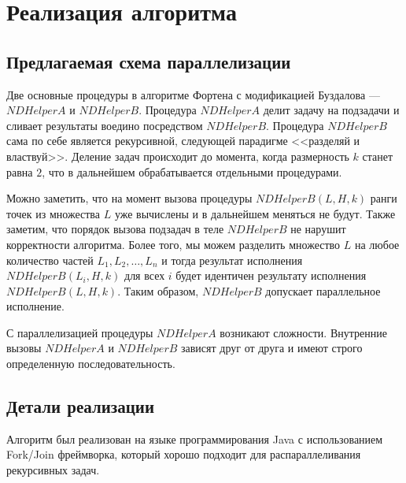 \chapter{Реализация алгоритма}
\section{Предлагаемая схема параллелизации}
Две основные процедуры в алгоритме Фортена с модификацией Буздалова --- $NDHelperA$ и $NDHelperB$. Процедура $NDHelperA$ делит задачу на подзадачи и сливает результаты воедино посредством $NDHelperB$. Процедура $NDHelperB$ сама по себе является рекурсивной, следующей парадигме <<разделяй и властвуй>>. Деление задач происходит до момента, когда размерность $k$ станет равна $2$, что в дальнейшем обрабатывается отдельными процедурами.

Можно заметить, что на момент вызова процедуры $NDHelperB(L, H, k)$ ранги точек из множества $L$ уже вычислены и в дальнейшем меняться не будут. Также заметим, что порядок вызова подзадач в теле $NDHelperB$ не нарушит корректности алгоритма. Более того, мы можем разделить множество $L$ на любое количество частей ${L_1, L_2,\ldots, L_n}$ и тогда результат исполнения $NDHelperB(L_i, H, k)$ для всех $i$ будет идентичен результату исполнения $NDHelperB(L, H, k)$. Таким образом, $NDHelperB$ допускает параллельное исполнение.

С параллелизацией процедуры $NDHelperA$ возникают сложности. Внутренние вызовы $NDHelperA$ и $NDHelperB$ зависят друг от друга и имеют строго определенную последовательность. 

\section{Детали реализации}
Алгоритм был реализован на языке программирования Java с использованием Fork/Join фреймворка, который хорошо подходит для распараллеливания рекурсивных задач.

